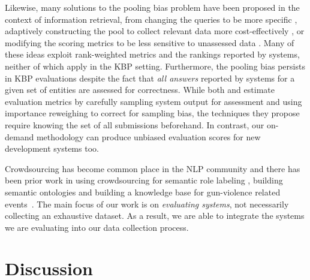 Likewise, many solutions to the pooling bias problem have been proposed in the context of information retrieval, from 
  changing the queries to be more specific \citep{buckley2007bias}, 
  adaptively constructing the pool to collect relevant data more cost-effectively \citep{zobel1998reliable,cormack1998efficient,aslam2006statistical}, or
  modifying the scoring metrics to be less sensitive to unassessed data \citep{buckley2004incomplete,sakai2008information,aslam2006statistical}.
Many of these ideas exploit rank-weighted metrics and the rankings reported by systems, neither of which apply in the KBP setting. Furthermore, the pooling bias persists in KBP evaluations despite the fact that \textit{all answers} reported by systems for a given set of entities are assessed for correctness.%
While both \citet{aslam2006statistical} and \citet{yilmaz2008simple} estimate evaluation metrics by carefully sampling system output for assessment and using importance reweighing to correct for sampling bias,
  the techniques they propose require knowing the set of all submissions beforehand.
In contrast, our on-demand methodology can produce unbiased evaluation scores for new development systems too.

Crowdsourcing has become common place in the NLP community and there has been prior work in using crowdsourcing for semantic role labeling \citep{he2015question}, building semantic ontologies \citep{vannella2014validating} and building a knowledge base for gun-violence related events~\cite{pavlick2016gun}.
The main focus of our work is on \textit{evaluating systems}, not necessarily collecting an exhaustive dataset. As a result, we are able to integrate the systems we are evaluating into our data collection process.

\section{Discussion}
\label{sec:discussion}

